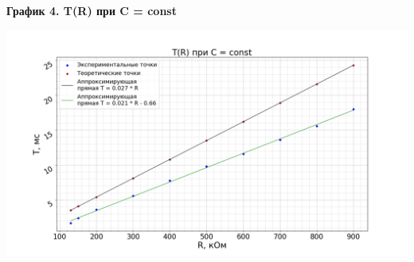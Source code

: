 \documentclass[14pt, a4paper,reqno]{article}
\begin{document}
    \textbf{График 4. T(R) при C = const}
    \begin{center}
        \includegraphics[width=\textwidth]{images/graph_4.png}
    \end{center}
\end{document}
